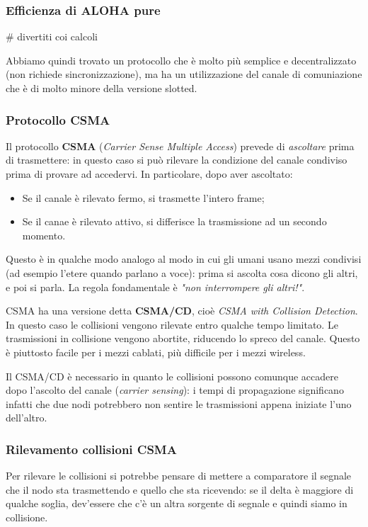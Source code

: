 \documentclass[a4paper,11pt]{article}
\begin{document}
\subsubsection{Efficienza di ALOHA pure}
# divertiti coi calcoli

\par\medskip

Abbiamo quindi trovato un protocollo che è molto più semplice e decentralizzato (non richiede sincronizzazione), ma ha un utilizzazione del canale di comuniazione che è di molto minore della versione slotted.

\subsubsection{Protocollo CSMA}
Il protocollo \textbf{CSMA} (\textit{Carrier Sense Multiple Access}) prevede di \textit{ascoltare} prima di trasmettere: in questo caso si può rilevare la condizione del canale condiviso prima di provare ad accedervi.
In particolare, dopo aver ascoltato:
\begin{itemize}
	\item Se il canale è rilevato fermo, si trasmette l'intero frame;
	\item Se il canae è rilevato attivo, si differisce la trasmissione ad un secondo momento.
\end{itemize}

Questo è in qualche modo analogo al modo in cui gli umani usano mezzi condivisi (ad esempio l'etere quando parlano a voce): prima si ascolta cosa dicono gli altri, e poi si parla. La regola fondamentale è \textit{"non interrompere gli altri!"}.

CSMA ha una versione detta \textbf{CSMA/CD}, cioè \textit{CSMA with Collision Detection}.
In questo caso le collisioni vengono rilevate entro qualche tempo limitato.
Le trasmissioni in collisione vengono abortite, riducendo lo spreco del canale.
Questo è piuttosto facile per i mezzi cablati, più difficile per i mezzi wireless. 

Il CSMA/CD è necessario in quanto le collisioni possono comunque accadere dopo l'ascolto del canale (\textit{carrier sensing}): i tempi di propagazione significano infatti che due nodi potrebbero non sentire le trasmissioni appena iniziate l'uno dell'altro.

\subsubsection{Rilevamento collisioni CSMA}
Per rilevare le collisioni si potrebbe pensare di mettere a comparatore il segnale che il nodo sta trasmettendo e quello che sta ricevendo: se il delta è maggiore di qualche soglia, dev'essere che c'è un altra sorgente di segnale e quindi siamo in collisione.
\end{document}

